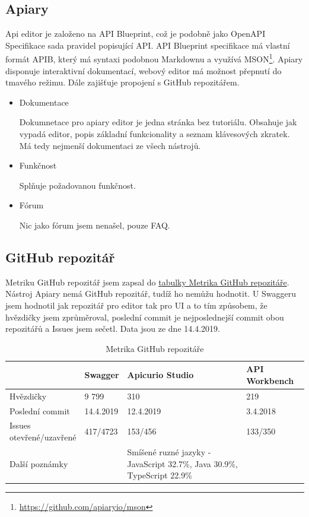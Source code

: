 \documentclass[thesis=B,czech]{FITthesis}[2012/06/26]
\begin{document}
        \subsection{Apiary}
            Api editor je založeno na API Blueprint, což je podobně jako OpenAPI Specifikace sada pravidel popisující API. API Blueprint specifikace má vlastní formát APIB, který má syntaxi podobnou Markdownu a využívá MSON\footnote{\url{https://github.com/apiaryio/mson}}.
            Apiary disponuje interaktivní dokumentací, webový editor má možnost přepnutí do tmavého režimu. Dále zajišťuje propojení s GitHub repozitářem.
            \begin{itemize}
                \item Dokumentace
                
                    Dokumnetace pro apiary editor je jedna stránka bez tutoriálu. Obsahuje jak vypadá editor, popis základní funkcionality a seznam klávesových zkratek. Má tedy nejmenší dokumentaci ze všech nástrojů.
                \item Funkčnost
                
                    Splňuje požadovanou funkčnost.
                \item Fórum
                
                    Nic jako fórum jsem nenašel, pouze FAQ.
            \end{itemize}
            \cite{apiary}
        \subsection{GitHub repozitář}
            Metriku GitHub repozitář jsem zapsal do \hyperref[tab:tabulkaPokryti]{tabulky Metrika GitHub repozitáře}.
            Nástroj Apiary nemá GitHub repozitář, tudíž ho nemůžu hodnotit. U Swaggeru jsem hodnotil jak repozitář pro editor tak pro UI a to tím způsobem, že hvězdičky jsem zprůměroval, poslední commit je nejposlednejší commit obou repozitářů a Issues jsem sečetl. Data jsou ze dne 14.4.2019.
            \begin{table}[h!]
            	\caption{Metrika GitHub repozitáře \cite{githubSwaggerUI, githubSwaggerEditor, githubApicur, githubApiworkbench}} \label{tabulkaMatrikyGitHub}
            	\begin{tabular}{| p{3cm} | p{2cm} | p{5cm} | p{2cm} |}  \hline
            		 & Swagger & Apicurio Studio & API Workbench
            		\tabularnewline \hline \hline
                    Hvězdičky & 9 799 & 310 & 219
                	\tabularnewline \hline
                    Poslední commit & 14.4.2019 & 12.4.2019 & 3.4.2018
                	\tabularnewline \hline
                    \parbox[t]{3cm}{Issues \\otevřené/uzavřené} & 417/4723 & 153/456 & 133/350
                	\tabularnewline \hline
                    Další poznámky & & Smíšené ruzné jazyky - JavaScript 32.7\%, Java 30.9\%, TypeScript 22.9\% &
                	\tabularnewline \hline
                \end{tabular}
            \end{table}
\end{document}
